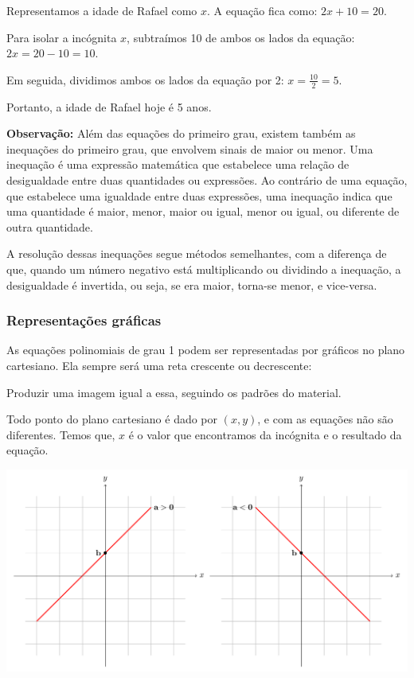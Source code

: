 {Representamos a idade de Rafael como $x$. A equação fica como:
$2x + 10 = 20$.

Para isolar a incógnita $x$, subtraímos 10 de ambos os lados da equação:
$2x = 20 - 10 = 10$.

Em seguida, dividimos ambos os lados da equação por 2:
$x = \frac{10}{2} = 5$.

Portanto, a idade de Rafael hoje é 5 anos.

\medskip \noindent \textbf{Observação:}
Além das equações do primeiro grau, existem também as inequações do primeiro grau, que envolvem sinais de maior ou menor. 
Uma inequação é uma expressão matemática que estabelece uma relação de desigualdade entre duas quantidades ou expressões. Ao contrário de uma equação, que estabelece uma igualdade entre duas expressões, uma inequação indica que uma quantidade é maior, menor, maior ou igual, menor ou igual, ou diferente de outra quantidade.

A resolução dessas inequações segue métodos semelhantes, com a diferença de que, quando um número negativo está multiplicando ou dividindo a inequação, a desigualdade é invertida, ou seja, se era maior, torna-se menor, e vice-versa.



\subsubsection{Representações gráficas}

As equações polinomiais de grau 1 podem ser representadas por gráficos
no plano cartesiano. Ela sempre será uma reta crescente ou decrescente:


Produzir uma imagem igual a essa, seguindo os padrões do material.


Todo ponto do plano cartesiano é dado por $(x,y)$, e com as equações
não são diferentes. Temos que, $x$ é o valor que encontramos da incógnita
e o resultado da equação.

\vspace*{2em}\hfill\includegraphics[width=.7\textwidth]{./tikz/eixos.pdf}\hfill\medskip


}
